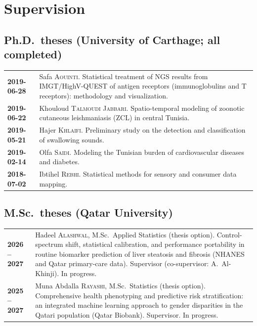 \documentclass[10pt,a4paper]{article}
\makeatletter
\newenvironment{cvdated}{%
  \begin{longtable}{@{}>{\raggedleft\arraybackslash\bfseries}p{3.35cm}@{\hspace{0.35cm}}p{\dimexpr\textwidth-3.7cm\relax}@{}}}%
  {\end{longtable}\vspace{-10pt}}
\newcommand{\cvrow}[2]{#1 & #2 \\[3pt]}
\makeatother
\begin{document}
\section{Supervision}
\subsection{Ph.D.\ theses (University of Carthage; all completed)}
\begin{cvdated}
\cvrow{2019-06-28}{Safa \textsc{Aouinti}. Statistical treatment of NGS results from IMGT/HighV-QUEST of antigen receptors (immunoglobulins and T receptors): methodology and visualization.}
\cvrow{2019-06-22}{Khouloud \textsc{Talmoudi Jabbari}. Spatio-temporal modeling of zoonotic cutaneous leishmaniasis (ZCL) in central Tunisia.}
\cvrow{2019-05-21}{Hajer \textsc{Khlaifi}. Preliminary study on the detection and classification of swallowing sounds.}
\cvrow{2019-02-14}{Olfa \textsc{Saidi}. Modeling the Tunisian burden of cardiovascular diseases and diabetes.}
\cvrow{2018-07-02}{Ibtihel \textsc{Rebhi}. Statistical methods for sensory and consumer data mapping.}
\end{cvdated}

\subsection{M.Sc.\ theses (Qatar University)}
\begin{cvdated}
\cvrow{2026 -- 2027}{Hadeel \textsc{Alashwal}, M.Sc.\ Applied Statistics (thesis option). Control-spectrum shift,
statistical calibration, and performance portability in routine biomarker prediction of liver steatosis and fibrosis
(NHANES and Qatar primary-care data). Supervisor (co-supervisor: A.~Al-Khinji). In progress.}
\cvrow{2025 -- 2027}{Muna Abdalla \textsc{Rayashi}, M.Sc.\ Statistics (thesis option). Comprehensive health phenotyping
and predictive risk stratification: an integrated machine learning approach to gender disparities in the Qatari
population (Qatar Biobank). Supervisor. In progress.}
\end{cvdated}
\end{document}
